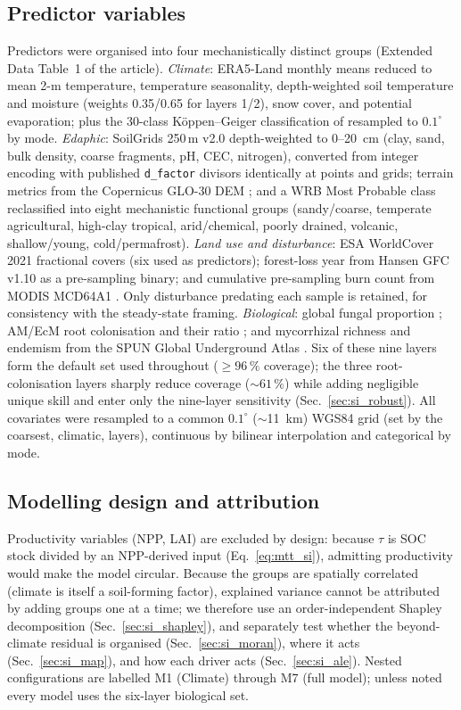 \documentclass[12pt, a4paper]{article}
\begin{document}
\subsection{Predictor variables}
Predictors were organised into four mechanistically distinct groups (Extended Data
Table~1 of the article).
\emph{Climate}: ERA5-Land monthly means \citep[2001--2020;][]{MunozSabater2021} reduced
to mean 2-m temperature, temperature seasonality, depth-weighted soil temperature and
moisture (weights 0.35/0.65 for layers 1/2), snow cover, and potential evaporation;
plus the 30-class K\"oppen--Geiger classification of \citet{Beck2023} resampled to
$0.1^{\circ}$ by mode.
\emph{Edaphic}: SoilGrids 250\,m v2.0 \citep{Poggio2021} depth-weighted to 0--20~cm
(clay, sand, bulk density, coarse fragments, pH, CEC, nitrogen), converted from integer
encoding with published \texttt{d\_factor} divisors identically at points and grids;
terrain metrics from the Copernicus GLO-30 DEM \citep{CopernicusDEM2022}; and a WRB Most
Probable class \citep{Poggio2021} reclassified into eight mechanistic functional groups
(sandy/coarse, temperate agricultural, high-clay tropical, arid/chemical, poorly
drained, volcanic, shallow/young, cold/permafrost).
\emph{Land use and disturbance}: ESA WorldCover 2021 \citep{Zanaga2022} fractional
covers (six used as predictors); forest-loss year from Hansen GFC v1.10
\citep{Hansen2013} as a pre-sampling binary; and cumulative pre-sampling burn count
from MODIS MCD64A1 \citep[2001--2020;][]{Giglio2018}. Only disturbance predating each
sample is retained, for consistency with the steady-state framing.
\emph{Biological}: global fungal proportion \citep{Yu2022}; AM/EcM root colonisation and
their ratio \citep{Barcelo2023}; and mycorrhizal richness and endemism from the SPUN
Global Underground Atlas \citep{VanNuland2025}. Six of these nine layers form the
default set used throughout ($\geq96\,\%$ coverage); the three \citet{Barcelo2023}
root-colonisation layers sharply reduce coverage (${\sim}61\,\%$) while adding
negligible unique skill and enter only the nine-layer sensitivity
(Sec.~\ref{sec:si_robust}).
All covariates were resampled to a common $0.1^{\circ}$ ($\sim$11~km) WGS84 grid
(set by the coarsest, climatic, layers), continuous by bilinear interpolation and
categorical by mode.

\subsection{Modelling design and attribution}
Productivity variables (NPP, LAI) are excluded by design: because $\tau$ is SOC stock
divided by an NPP-derived input (Eq.~\ref{eq:mtt_si}), admitting productivity would make
the model circular. Because the groups are spatially correlated (climate is itself a
soil-forming factor), explained variance cannot be attributed by adding groups one at a
time; we therefore use an order-independent Shapley decomposition
(Sec.~\ref{sec:si_shapley}), and separately test whether the beyond-climate residual is
organised (Sec.~\ref{sec:si_moran}), where it acts (Sec.~\ref{sec:si_map}), and how each
driver acts (Sec.~\ref{sec:si_ale}). Nested configurations are labelled M1 (Climate)
through M7 (full model); unless noted every model uses the six-layer biological set.
\end{document}
